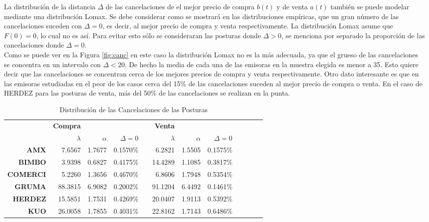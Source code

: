 \documentclass[11pt]{article}
\numberwithin{equation}{section} %
\begin{document}
La distribución de la distancia $\Delta$ de las cancelaciones de el mejor precio de compra $b(t)$ y de venta $a(t)$ también se puede modelar mediante una distribución Lomax. Se debe considerar como se mostrará en las distribuciones empíricas, que un gran número de las cancelaciones suceden con $\Delta=0$, es decir, al mejor precio de compra y venta respectivamente. La distribución Lomax asume que $F(0)=0$, lo cual no es así. Para evitar esto sólo se consideraran las posturas donde $\Delta>0$, se menciona por separado la proporción de las cancelaciones donde $\Delta=0$.\\

Como se puede ver en la Figura \ref{fig:canc} en este caso la distribución Lomax no es la más adecuada, ya que el grueso de las cancelaciones se concentra en un intervalo con $\Delta<20$. De hecho la media de cada una de las emisoras en la muestra elegida es menor a 35. Esto quiere decir que las cancelaciones se concentran cerca de los mejores precios de compra y venta respectivamente. Otro dato interesante es que en las emisoras estudiadas en el peor de los casos cerca del 15\% de las cancelaciones suceden al mejor precio de compra o venta. En el caso de HERDEZ para las posturas de venta, más del 50\% de las cancelaciones se realizan en la punta.

\begin{table}[htbp]
\centering
\caption{Distribución de las Cancelaciones de las Posturas}
\begin{tabular}{r|r|r|r|r|r|r|r|r|r|r|r|}
\multicolumn{1}{r}{} & \multicolumn{1}{r}{\textbf{Compra}} & \multicolumn{1}{r}{} & \multicolumn{1}{r}{} & \multicolumn{1}{r}{} & \multicolumn{1}{r}{\textbf{Venta}} & \multicolumn{1}{r}{} \\
\cline{2-4}
\cline{6-8}
& $\lambda$ & $\alpha$ & $\Delta=0$ & & $\lambda$ & $\alpha$ & $\Delta=0$ \\
\cline{2-4}
\cline{6-8}
\textbf{AMX}   & 7.6567 & 1.7677 & 0.1570\% & & 6.2821 & 1.5505 & 0.1575\% \\
\textbf{BIMBO} & 3.9398 & 0.6827 & 0.4175\% & & 14.4289 & 1.1085 & 0.3817\% \\
\textbf{COMERCI}   & 5.2260 & 1.3656 & 0.4670\% & & 6.8606 & 1.7948 & 0.5354\% \\
\textbf{GRUMA} & 88.3815 & 6.9082 & 0.2002\% & & 91.1204 & 6.4492 & 0.1461\% \\
\textbf{HERDEZ}   & 15.5851 & 1.7531 & 0.4269\% & & 20.0407 & 1.9113 & 0.5392\% \\
\textbf{KUO}   & 26.0058 & 1.7855 & 0.4031\% & & 22.8162 & 1.7143 & 0.6486\% \\
\cline{2-4}
\cline{6-8}
\end{tabular}%
\label{tab:powercanc}%
\end{table}%
\end{document}
